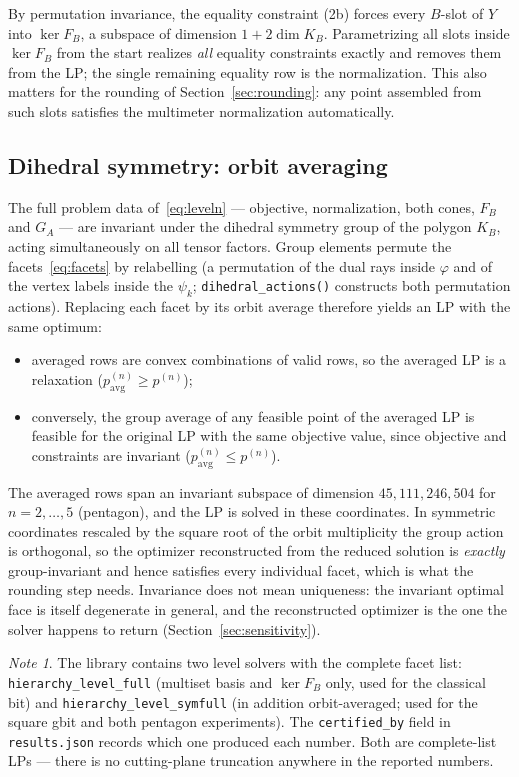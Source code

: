 \documentclass[11pt,a4paper]{article}
\newcommand*{\code}[1]{\texttt{#1}}
\theoremstyle{remark}
\newtheorem*{note}{Note}
\begin{document}
By permutation invariance, the equality constraint (2b) forces every
$B$-slot of $Y$ into $\ker F_B$, a subspace of dimension $1+2\dim K_B$.
Parametrizing all slots inside $\ker F_B$ from the start realizes
\emph{all} equality constraints exactly and removes them from the LP; the
single remaining equality row is the normalization. This also matters for
the rounding of Section~\ref{sec:rounding}: any point assembled from such
slots satisfies the multimeter normalization automatically.

\subsection{Dihedral symmetry: orbit averaging}\label{sec:orbit}

The full problem data of~\eqref{eq:leveln} --- objective, normalization,
both cones, $F_B$ and $G_A$ --- are invariant under the dihedral symmetry
group of the polygon $K_B$, acting simultaneously on all tensor factors.
Group elements permute the facets~\eqref{eq:facets} by relabelling
(a permutation of the dual rays inside $\varphi$ and of the vertex labels
inside the $\psi_{k}$; \code{dihedral\_actions()} constructs both
permutation actions). Replacing each facet by its orbit average therefore
yields an LP with the same optimum:
\begin{itemize}[leftmargin=1.5em]
\item averaged rows are convex combinations of valid rows, so the
averaged LP is a relaxation ($p^{(n)}_{\mathrm{avg}}\geq p^{(n)}$);
\item conversely, the group average of any feasible point of the averaged
LP is feasible for the original LP with the same objective value, since
objective and constraints are invariant ($p^{(n)}_{\mathrm{avg}}\leq p^{(n)}$).
\end{itemize}
The averaged rows span an invariant subspace of dimension
$45, 111, 246, 504$ for $n=2,\ldots,5$ (pentagon), and the LP is solved in
these coordinates. In symmetric coordinates rescaled by the square root of
the orbit multiplicity the group action is orthogonal, so the optimizer
reconstructed from the reduced solution is \emph{exactly} group-invariant
and hence satisfies every individual facet, which is what the rounding
step needs. Invariance does not mean uniqueness: the invariant optimal face
is itself degenerate in general, and the reconstructed optimizer is the one
the solver happens to return (Section~\ref{sec:sensitivity}).

\begin{note}\sloppy
The library contains two level solvers with the complete facet list:
\code{hierarchy\_level\_full} (multiset basis and $\ker F_B$ only, used
for the classical bit) and \code{hierarchy\_level\_symfull} (in addition
orbit-averaged; used for the square gbit and both pentagon experiments).
The \code{certified\_by} field in \code{results.json} records which one
produced each number. Both are complete-list LPs --- there is no
cutting-plane truncation anywhere in the reported numbers.
\end{note}
\end{document}
